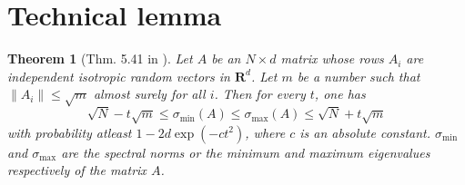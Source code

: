 \documentclass[12pt]{article}
\newcommand{\mb}{\mathbf}
\newtheorem{theorem}{Theorem}
\begin{document}
\section{Technical lemma}
\begin{theorem}[Thm. 5.41 in \cite{vershynin2010introduction}]
\label{a-thm:spectralNormCOncentration}
Let $A$ be an $N\times d$ matrix whose rows $A_i$ are independent isotropic random vectors in $\mb R^d$. Let $m$ be a number such that $\|A_i\| \le \sqrt{m}$ almost surely for all $i$. Then for every $t$, one has
$$\sqrt{N} - t\sqrt{m} \le \sigma_{\min}(A) \le \sigma_{\max}(A) \le \sqrt{N} + t\sqrt{m}$$
with probability atleast $1-2d\exp(-ct^2)$, where $c$ is an absolute constant. $\sigma_{\min}$ and $\sigma_{\max}$ are the spectral norms or the minimum and maximum eigenvalues respectively of the matrix $A$.
\end{theorem}


\ifdefined\COMPLETE
\else 
\end{document}
